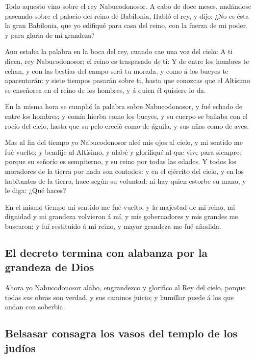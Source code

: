  Todo aquesto vino sobre el rey Nabucodonosor.
 A cabo de doce meses, andándose paseando sobre el palacio
del reino de Babilonia,  Habló el rey, y dijo: ¿No es ésta
la gran Babilonia, que yo edifiqué para casa del reino, con la fuerza de
mi poder, y para gloria de mi grandeza?

 Aun estaba la palabra en la boca del rey, cuando cae una
voz del cielo: A ti dicen, rey Nabucodonosor; el reino es traspasado de
ti:  Y de entre los hombres te echan, y con las bestias del
campo será tu morada, y como á los bueyes te apacentarán: y siete
tiempos pasarán sobre ti, hasta que conozcas que el Altísimo se
enseñorea en el reino de los hombres, y á quien él quisiere lo da.

 En la misma hora se cumplió la palabra sobre
Nabucodonosor, y fué echado de entre los hombres; y comía hierba como
los bueyes, y su cuerpo se bañaba con el rocío del cielo, hasta que su
pelo creció como de águila, y sus uñas como de aves.

 Mas al fin del tiempo yo Nabucodonosor alcé mis ojos al
cielo, y mi sentido me fué vuelto; y bendije al Altísimo, y alabé y
glorifiqué al que vive para siempre; porque su señorío es sempiterno, y
su reino por todas las edades.  Y todos los moradores de la
tierra por nada son contados: y en el ejército del cielo, y en los
habitantes de la tierra, hace según su voluntad: ni hay quien estorbe su
mano, y le diga: ¿Qué haces?

 En el mismo tiempo mi sentido me fué vuelto, y la majestad
de mi reino, mi dignidad y mi grandeza volvieron á mí, y mis
gobernadores y mis grandes me buscaron; y fuí restituído á mi reino, y
mayor grandeza me fué añadida.

\hypertarget{el-decreto-termina-con-alabanza-por-la-grandeza-de-dios}{%
\subsection{El decreto termina con alabanza por la grandeza de
Dios}\label{el-decreto-termina-con-alabanza-por-la-grandeza-de-dios}}

 Ahora yo Nabucodonosor alabo, engrandezco y glorifico al
Rey del cielo, porque todas sus obras son verdad, y sus caminos juicio;
y humillar puede á los que andan con soberbia.

\hypertarget{belsasar-consagra-los-vasos-del-templo-de-los-juduxedos}{%
\subsection{Belsasar consagra los vasos del templo de los
judíos}\label{belsasar-consagra-los-vasos-del-templo-de-los-juduxedos}}

